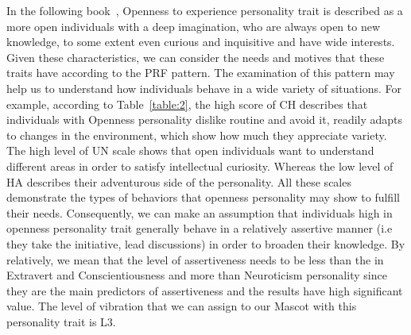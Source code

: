 In the following book~\cite{matthews2003personality}, Openness to experience personality trait is described as a more open individuals with a deep imagination, who are always open to new knowledge, to some extent even curious and inquisitive and have wide interests. Given these characteristics, we can consider the needs and motives that these traits have according to the PRF pattern. The examination of this pattern may help us to understand how individuals behave in a wide variety of situations. 
For example, according to Table~\ref{table:2}, the high score of CH describes that individuals with Openness personality dislike routine and avoid it, readily adapts to changes in the environment, which show how much they appreciate variety. The high level of UN scale shows that open individuals want to understand different areas in order to satisfy intellectual curiosity. Whereas the low level of HA describes their adventurous side of the personality. All these scales demonstrate the types of behaviors that openness personality may show to fulfill their needs. Consequently, we can make an assumption that individuals high in openness personality trait generally behave in a relatively assertive manner (i.e they take the initiative, lead discussions) in order to broaden their knowledge. By relatively, we mean that the level of assertiveness needs to be less than the in Extravert and Conscientiousness and more than Neuroticism personality since they are the main predictors of assertiveness and the results have high significant value. 
The level of vibration that we can assign to our Mascot with this personality trait is L3. 
 

